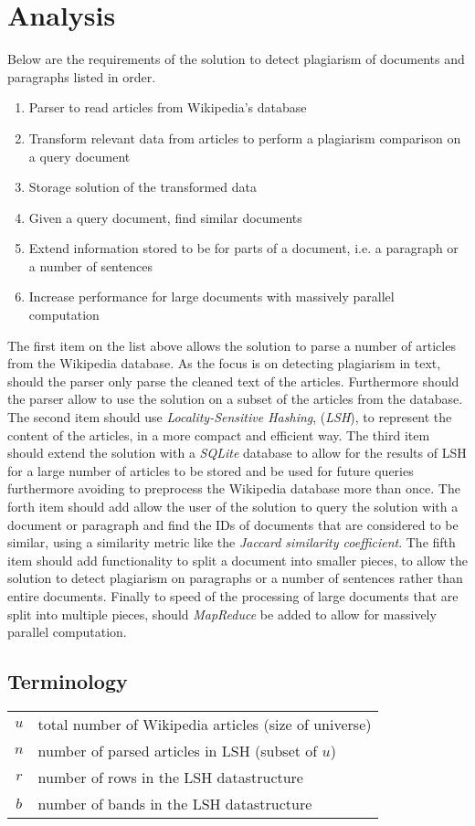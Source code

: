 \section{Analysis}

Below are the requirements of the solution to detect plagiarism of documents and paragraphs listed in order.

\begin{enumerate}
    \item Parser to read articles from Wikipedia's database
    \item Transform relevant data from articles to perform a plagiarism comparison on a query document
    \item Storage solution of the transformed data
    \item Given a query document, find similar documents
    \item Extend information stored to be for parts of a document, i.e. a paragraph or a number of sentences
    \item Increase performance for large documents with massively parallel computation
\end{enumerate}

The first item on the list above allows the solution to parse a number of articles from the Wikipedia database. As the focus is on detecting plagiarism in text, should the parser only parse the cleaned text of the articles. Furthermore should the parser allow to use the solution on a subset of the articles from the database. The second item should use \emph{Locality-Sensitive Hashing}, (\emph{LSH}), to represent the content of the articles, in a more compact and efficient way. The third item should extend the solution with a \emph{SQLite} database to allow for the results of LSH for a large number of articles to be stored and be used for future queries furthermore avoiding to preprocess the Wikipedia database more than once. The forth item should add allow the user of the solution to query the solution with a document or paragraph and find the IDs of documents that are considered to be similar, using a similarity metric like the \emph{Jaccard similarity coefficient}. The fifth item should add functionality to split a document into smaller pieces, to allow the solution to detect plagiarism on paragraphs or a number of sentences rather than entire documents. Finally to speed of the processing of large documents that are split into multiple pieces, should \emph{MapReduce} be added to allow for massively parallel computation.

\subsection{Terminology}
\begin{tabular}{cp{}}
  $u$ & total number of Wikipedia articles (size of universe) \\
  $n$ & number of parsed articles in LSH (subset of $u$) \\
  $r$ & number of rows in the LSH datastructure \\
  $b$ & number of bands in the LSH datastructure
\end{tabular}